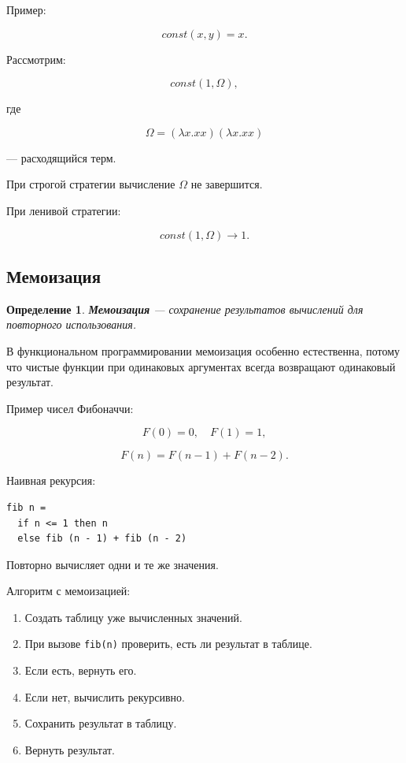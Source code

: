 \documentclass[12pt,a4paper]{article}
\newtheorem{definition}{Определение}
\begin{document}
Пример:

\[
const(x,y) = x.
\]

Рассмотрим:

\[
const(1, \Omega),
\]

где

\[
\Omega = (\lambda x. x x)(\lambda x. x x)
\]

--- расходящийся терм.

При строгой стратегии вычисление $\Omega$ не завершится.

При ленивой стратегии:

\[
const(1,\Omega) \to 1.
\]

\subsection{Мемоизация}

\begin{definition}
\textbf{Мемоизация} --- сохранение результатов вычислений для повторного использования.
\end{definition}

В функциональном программировании мемоизация особенно естественна, потому что чистые функции при одинаковых аргументах всегда возвращают одинаковый результат.

Пример чисел Фибоначчи:

\[
F(0)=0,\quad F(1)=1,
\]

\[
F(n)=F(n-1)+F(n-2).
\]

Наивная рекурсия:

\begin{lstlisting}
fib n =
  if n <= 1 then n
  else fib (n - 1) + fib (n - 2)
\end{lstlisting}

Повторно вычисляет одни и те же значения.

Алгоритм с мемоизацией:

\begin{enumerate}
  \item Создать таблицу уже вычисленных значений.
  \item При вызове \texttt{fib(n)} проверить, есть ли результат в таблице.
  \item Если есть, вернуть его.
  \item Если нет, вычислить рекурсивно.
  \item Сохранить результат в таблицу.
  \item Вернуть результат.
\end{enumerate}
\end{document}
